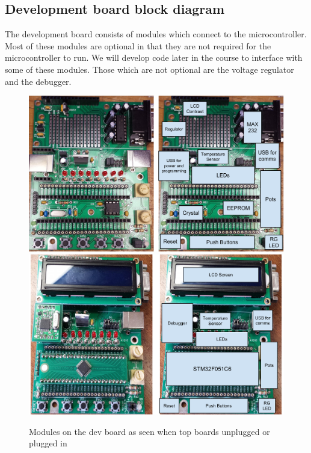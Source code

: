 \begin{table}
\caption{Comparison of specs of entry level computer to STM32F051C6.}
\label{table:specs_comp}
\end{table}

\subsection{Development board block diagram}
The development board consists of modules which connect to the microcontroller. Most of these modules are optional in that they are not required for the microcontroller to run. We will develop code later in the course to interface with some of these modules. Those which are not optional are the voltage regulator and the debugger.

\begin{figure}
  \centering
  \includegraphics[width=\textwidth]{./week1/dev_board_unplugged.pdf}\\
  \vspace{3mm}
  \includegraphics[width=\textwidth]{./week1/dev_board_plugged_in.pdf}
  \caption{Modules on the dev board as seen when top boards unplugged or plugged in}
\end{figure}

